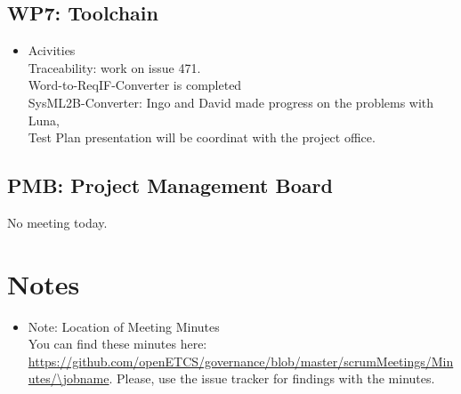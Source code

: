\documentclass[a4paper, 11pt]{article}
\begin{document}
\subsection{WP7: Toolchain}

\begin{itemize}
\item Acivities\\
Traceability: work on issue 471.\\
Word-to-ReqIF-Converter is completed\\
SysML2B-Converter: Ingo and David made progress on the problems with Luna,\\
Test Plan presentation will be coordinat with the project office.

\end{itemize}

\subsection{PMB: Project Management Board}

 No meeting today.

\section{Notes}
\begin{itemize}

\item Note: Location of Meeting Minutes\\
You can find these minutes here: \url{https://github.com/openETCS/governance/blob/master/scrumMeetings/Minutes/\jobname}. Please, use the issue tracker for findings with the minutes.

\end{itemize}
\end{document}
